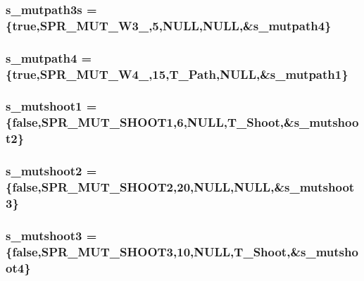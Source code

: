 \label{WL__ACT2_8C_aeeaa2d6e4b0038b7a5a1b87bc4bb59da}
\hypertarget{WL__ACT2_8C_a593ce82891d2271526db38adcd0780f5}{
\subsubsection[{s\_\-mutpath3s}]{ {\bf s\_\-mutpath3s} = \{true,SPR\_\-MUT\_\-W3\_,5,NULL,NULL,\&{\bf s\_\-mutpath4}\}}}
\label{WL__ACT2_8C_a593ce82891d2271526db38adcd0780f5}
\hypertarget{WL__ACT2_8C_a6fd0b4456ed6486482e1de8cd32746b1}{
\subsubsection[{s\_\-mutpath4}]{ {\bf s\_\-mutpath4} = \{true,SPR\_\-MUT\_\-W4\_,15,T\_\-Path,NULL,\&{\bf s\_\-mutpath1}\}}}
\label{WL__ACT2_8C_a6fd0b4456ed6486482e1de8cd32746b1}
\hypertarget{WL__ACT2_8C_ad78a0d350573bc05593a1eac68975bef}{
\subsubsection[{s\_\-mutshoot1}]{ {\bf s\_\-mutshoot1} = \{false,SPR\_\-MUT\_\-SHOOT1,6,NULL,T\_\-Shoot,\&{\bf s\_\-mutshoot2}\}}}
\label{WL__ACT2_8C_ad78a0d350573bc05593a1eac68975bef}
\hypertarget{WL__ACT2_8C_ac582ebfb069fba60e5cb6dc5657c6be6}{
\subsubsection[{s\_\-mutshoot2}]{ {\bf s\_\-mutshoot2} = \{false,SPR\_\-MUT\_\-SHOOT2,20,NULL,NULL,\&{\bf s\_\-mutshoot3}\}}}
\label{WL__ACT2_8C_ac582ebfb069fba60e5cb6dc5657c6be6}
\hypertarget{WL__ACT2_8C_a9573d4752c5dcfc9aadd50674ed38f54}{
\subsubsection[{s\_\-mutshoot3}]{ {\bf s\_\-mutshoot3} = \{false,SPR\_\-MUT\_\-SHOOT3,10,NULL,T\_\-Shoot,\&{\bf s\_\-mutshoot4}\}}}
